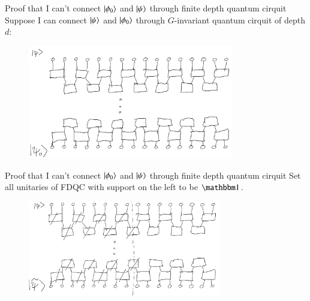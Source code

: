 \documentclass{beamer}
\begin{document}
\begin{frame}{Proof that I can't connect $\ket{\phi_0}$ and $\ket{\psi}$ through finite depth quantum cirquit}
	Suppose I can connect $\ket{\psi}$ and $\ket{\phi_0}$ through $G$-invariant quantum cirquit of depth $d$:
	\begin{figure}
		\center
		\includegraphics[width=0.8\textwidth]{Figures/ConnectingPsiAndPsi0Proof.png}
	\end{figure}
\end{frame}

\begin{frame}{Proof that I can't connect $\ket{\phi_0}$ and $\ket{\psi}$ through finite depth quantum cirquit}
	Set all unitaries of FDQC with support on the left to be $\id$.
	\begin{figure}
		\center
		\includegraphics[width=0.75\textwidth]{Figures/ConnectingPsiAndPsi0Proof2.png}
	\end{figure}
\end{frame}
\end{document}
